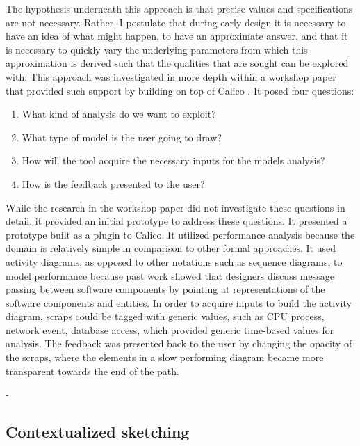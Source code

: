 The hypothesis underneath this approach is that precise values and specifications are not necessary. Rather, I postulate that during early design it is necessary to have an idea of what might happen, to have an approximate answer, and that it is necessary to quickly vary the underlying parameters from which this approximation is derived such that the qualities that are sought can be explored with. 
This approach was investigated in more depth within a workshop paper that provided such support by building on top of Calico \cite{mottalightweight}. It posed four questions:

\begin{enumerate}
	\item What kind of analysis do we want to exploit? 
	\item What type of model is the user going to draw? 
	\item How will the tool acquire the necessary inputs for the models analysis? 
	\item How is the feedback presented to the user?
\end{enumerate}

While the research in the workshop paper did not investigate these questions in detail, it provided an initial prototype to address these questions. It presented a prototype built as a plugin to Calico. It utilized performance analysis because the domain is relatively simple in comparison to other formal approaches. It used activity diagrams, as opposed to other notations such as sequence diagrams, to model performance because past work showed that designers discuss message passing between software components by pointing at representations of the software components and entities. In order to acquire inputs to build the activity diagram, scraps could be tagged with generic values, such as CPU process, network event, database access, which provided generic time-based values for analysis. The feedback was presented back to the user by changing the opacity of the scraps, where the elements in a slow performing diagram became more transparent towards the end of the path.

%
- 

\subsection{Contextualized sketching}

